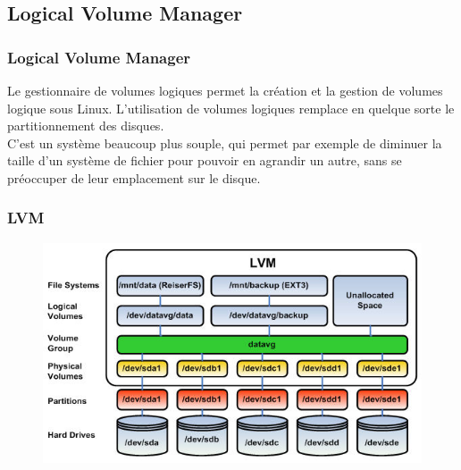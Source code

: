 \subsection{Logical Volume Manager}
\begin{frame}
	\frametitle{Logical Volume Manager}
	Le gestionnaire de volumes logiques permet la création et la gestion de volumes logique sous Linux. L'utilisation de volumes logiques remplace en quelque sorte le partitionnement des disques.\\
	
	C'est un système beaucoup plus souple, qui permet par exemple de diminuer la taille d'un système de fichier pour pouvoir en agrandir un autre, sans se préoccuper de leur emplacement sur le disque.\\
	\vspace{10pt}
	
	
\end{frame}
\begin{frame}[containsverbatim]
	\frametitle{LVM }
	\begin{figure}[!h]
		\centering
		\includegraphics[scale=0.5]{images/Lvm1}
	\end{figure}
\end{frame}

%	
%	
%	
%
%	
